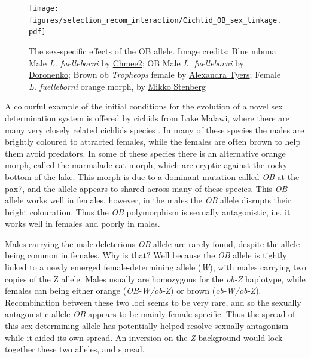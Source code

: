 \begin{figure} %
\begin{center}
\texttt{[image: figures/selection\_recom\_interaction/Cichlid\_OB\_sex\_linkage.pdf]}
\end{center}
\caption{The sex-specific effects of the OB allele.  \newline \noindent \tiny{Image credits: Blue mbuna Male  {\it L. fuelleborni} by \href{https://commons.wikimedia.org/wiki/File:Labeotropheus_fuelleborni_in_Botanic_garden_in_Teplice_(2).JPG}{Chmee2}; %
  OB  Male {\it L. fuelleborni} by \href{https://de.wikipedia.org/wiki/Schabemund-Buntbarsch\#/media/File:Labeotropheus_fuelleborni_01.jpg}{Doronenko};
  Brown ob  {\it Tropheops} female by \href{https://www.flickr.com/photos/52993488@N03/4890217915}{Alexandra Tyers};
  Female  {\it L. fuelleborni} orange morph,  by \href{https://commons.wikimedia.org/wiki/File:Labeotropheus_fuelleborni1.jpg}{Mikko Stenberg} 
}}
\end{figure}

A colourful example of the initial conditions for the evolution of a novel sex determination system is offered by cichids from Lake Malawi, where there are many very closely related cichlids species \citep{roberts2009sexual}. In many of these species the males are brightly coloured to attracted females, while the females are often brown to help them avoid predators. In some of these species there is an alternative orange morph, called the marmalade cat morph, which are cryptic against the rocky bottom of the lake. This morph is due to a dominant mutation called {\it OB} at the pax7, and the allele appears to shared across many of these species. This {\it OB} allele works well in females, however, in the males the {\it OB} allele disrupts their bright colouration. Thus the {\it OB} polymorphism is sexually antagonistic, i.e. it works well in females and poorly in males.

Males carrying the male-deleterious {\it OB} allele are rarely found, despite the allele being common in females. Why is that? Well because the {\it OB} allele is tightly linked to a newly emerged female-determining allele ({\it W}), with males carrying two copies of the Z allele. Males usually are homozygous for the {\it ob-Z} haplotype, while females can being either orange ({\it OB-W/ob-Z}) or brown ({\it ob-W/ob-Z}). Recombination between these two loci seems to be very rare, and so the sexually antagonistic allele {\it OB} appears to be mainly female specific. Thus the spread of this sex determining allele has potentially helped resolve sexually-antagonism while it aided its own spread. An inversion on the {\it Z} background would lock together these two alleles, and spread.  

